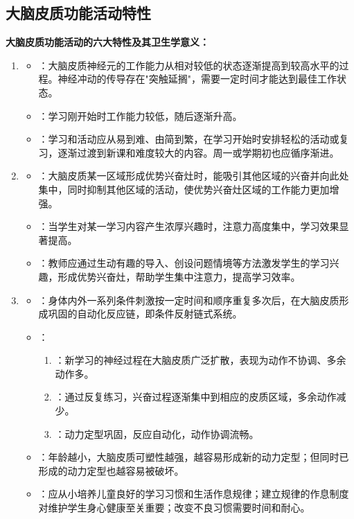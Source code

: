 \subsection{大脑皮质功能活动特性}

\begin{keybox}
\textbf{大脑皮质功能活动的六大特性及其卫生学意义：}

\begin{enumerate}[leftmargin=*]
    \item {}
    \begin{itemize}
        \item {}：大脑皮质神经元的工作能力从相对较低的状态逐渐提高到较高水平的过程。神经冲动的传导存在"突触延搁"，需要一定时间才能达到最佳工作状态。
        \item {}：学习刚开始时工作能力较低，随后逐渐升高。
        \item {}：学习和活动应从易到难、由简到繁，在学习开始时安排轻松的活动或复习，逐渐过渡到新课和难度较大的内容。周一或学期初也应循序渐进。
    \end{itemize}

    \item {}
    \begin{itemize}
        \item {}：大脑皮质某一区域形成优势兴奋灶时，能吸引其他区域的兴奋并向此处集中，同时抑制其他区域的活动，使优势兴奋灶区域的工作能力更加增强。
        \item {}：当学生对某一学习内容产生浓厚兴趣时，注意力高度集中，学习效果显著提高。
        \item {}：教师应通过生动有趣的导入、创设问题情境等方法激发学生的学习兴趣，形成优势兴奋灶，帮助学生集中注意力，提高学习效率。
    \end{itemize}

    \item {}
    \begin{itemize}
        \item {}：身体内外一系列条件刺激按一定时间和顺序重复多次后，在大脑皮质形成巩固的自动化反应链，即条件反射链式系统。
        \item {}：
        \begin{enumerate}
            \item {}：新学习的神经过程在大脑皮质广泛扩散，表现为动作不协调、多余动作多。
            \item {}：通过反复练习，兴奋过程逐渐集中到相应的皮质区域，多余动作减少。
            \item {}：动力定型巩固，反应自动化，动作协调流畅。
        \end{enumerate}
        \item {}：年龄越小，大脑皮质可塑性越强，越容易形成新的动力定型；但同时已形成的动力定型也越容易被破坏。
        \item {}：应从小培养儿童良好的学习习惯和生活作息规律；建立规律的作息制度对维护学生身心健康至关重要；改变不良习惯需要时间和耐心。
    \end{itemize}


\end{enumerate}
\end{keybox}
